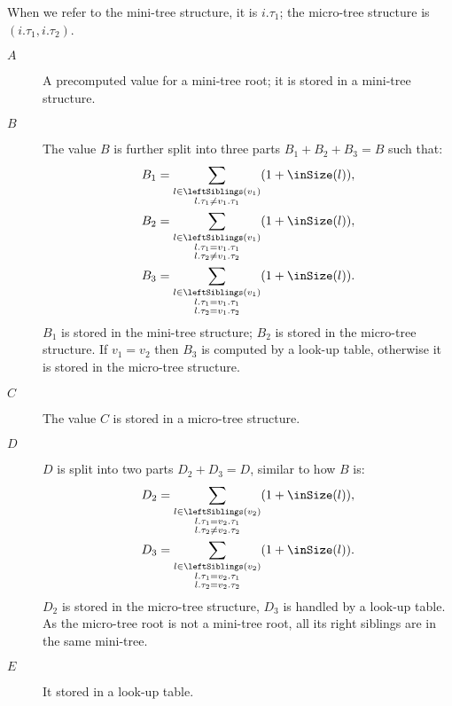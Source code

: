 When we refer to the mini-tree structure, it is $i.\tau_1$; the micro-tree structure is $(i.\tau_1, i.\tau_2)$.
\begin{description}
	\item[$A$]
	A precomputed value for a mini-tree root; it is stored in a mini-tree structure.
	
	\item[$B$]
	The value $B$ is further split into three parts $B_1 + B_2 + B_3 = B$ such that:
	\begin{align*}
		B_1 &= \sum_{\substack{l \in \leftSiblings(v_1) \\ l.\tau_1 \ne v_1.\tau_1}} (1 + \inSize(l)), \\
		B_2 &= \sum_{\substack{l \in \leftSiblings(v_1) \\ l.\tau_1 = v_1.\tau_1 \\ l.\tau_2 \ne v_1.\tau_2}} (1 + \inSize(l)), \\
		B_3 &= \sum_{\substack{l \in \leftSiblings(v_1) \\ l.\tau_1 = v_1.\tau_1 \\ l.\tau_2 = v_1.\tau_2}} (1 + \inSize(l)).
	\end{align*}
	$B_1$ is stored in the mini-tree structure; $B_2$ is stored in the micro-tree structure.
	If $v_1 = v_2$ then $B_3$ is computed by a look-up table, otherwise it is stored in the micro-tree structure.
	
	\item[$C$]
	The value $C$ is stored in a micro-tree structure.
	
	\item[$D$]
	$D$ is split into two parts $D_2 + D_3 = D$, similar to how $B$ is:
	\begin{align*}
		D_2 &= \sum_{\substack{l \in \leftSiblings(v_2) \\ l.\tau_1 = v_2.\tau_1 \\ l.\tau_2 \ne v_2.\tau_2}} (1 + \inSize(l)), \\
		D_3 &= \sum_{\substack{l \in \leftSiblings(v_2) \\ l.\tau_1 = v_2.\tau_1 \\ l.\tau_2 = v_2.\tau_2}} (1 + \inSize(l)).
	\end{align*}
	$D_2$ is stored in the micro-tree structure, $D_3$ is handled by a look-up table.
	As the micro-tree root is not a mini-tree root, all its right siblings are in the same mini-tree.
	
	\item[$E$]
	It stored in a look-up table.
\end{description}


